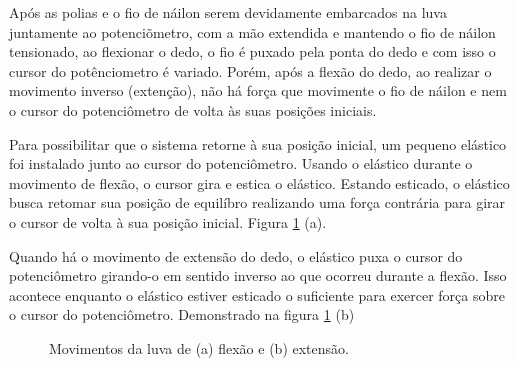 \documentclass[
	12pt,				%
	openright,			%
	oneside,			%
	a4paper,			%
	english,			%
	brazil				%
	]{abntex2}
\begin{document}



		Após as polias e o fio de náilon serem devidamente embarcados na luva juntamente ao potenciõmetro, com a mão extendida e mantendo o fio de náilon tensionado, ao flexionar o dedo, o fio é puxado pela ponta do dedo e com isso o cursor do potênciometro é variado. Porém, após a flexão do dedo, ao realizar o movimento inverso (extenção), não há força que movimente o fio de náilon e nem o cursor do potenciômetro de volta às suas posições iniciais.
		
		Para possibilitar que o sistema retorne à sua posição inicial, um pequeno elástico foi instalado junto ao cursor do potenciômetro. Usando o elástico durante o movimento de flexão, o cursor gira e estica o elástico. Estando esticado, o elástico busca retomar sua posição de equilíbro realizando uma força contrária para girar o cursor de volta à sua posição inicial. Figura \ref{Fig:glove-flex-and-extend2} (a).
		
		Quando há o movimento de extensão do dedo, o elástico puxa o cursor do potenciômetro girando-o em sentido inverso ao que ocorreu durante a flexão. Isso acontece enquanto o elástico estiver esticado o suficiente para exercer força sobre o cursor do potenciômetro. Demonstrado na figura \ref{Fig:glove-flex-and-extend2} (b)
		

	\begin{figure}[!htb]
		 \centering
		 \caption{ Movimentos da luva de (a) flexão e (b) extensão.} 
		 \centering
		 \label{Fig:glove-flex-and-extend2}
	\end{figure}
\end{document}
